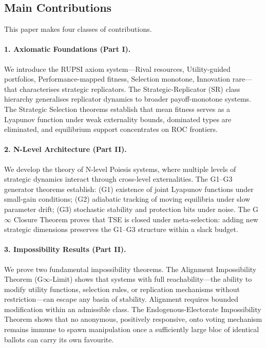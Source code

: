 \documentclass[12pt]{article}
\begin{document}
\subsection{Main Contributions}

This paper makes four classes of contributions.

\paragraph{1. Axiomatic Foundations (Part I).} We introduce the RUPSI axiom system---Rival resources, Utility-guided portfolios, Performance-mapped fitness, Selection monotone, Innovation rare---that characterises strategic replicators. The Strategic-Replicator (SR) class hierarchy generalises replicator dynamics to broader payoff-monotone systems. The Strategic Selection theorems establish that mean fitness serves as a Lyapunov function under weak externality bounds, dominated types are eliminated, and equilibrium support concentrates on ROC frontiers.

\paragraph{2. N-Level Architecture (Part II).} We develop the theory of N-level Poiesis systems, where multiple levels of strategic dynamics interact through cross-level externalities. The G1--G3 generator theorems establish: (G1) existence of joint Lyapunov functions under small-gain conditions; (G2) adiabatic tracking of moving equilibria under slow parameter drift; (G3) stochastic stability and protection bits under noise. The G$\infty$ Closure Theorem proves that TSE is closed under meta-selection: adding new strategic dimensions preserves the G1--G3 structure within a slack budget.

\paragraph{3. Impossibility Results (Part II).} We prove two fundamental impossibility theorems. The Alignment Impossibility Theorem (G$\infty$-Limit) shows that systems with full reachability---the ability to modify utility functions, selection rules, or replication mechanisms without restriction---can escape any basin of stability. Alignment requires bounded modification within an admissible class. The Endogenous-Electorate Impossibility Theorem shows that no anonymous, positively responsive, onto voting mechanism remains immune to spawn manipulation once a sufficiently large bloc of identical ballots can carry its own favourite.
\end{document}
